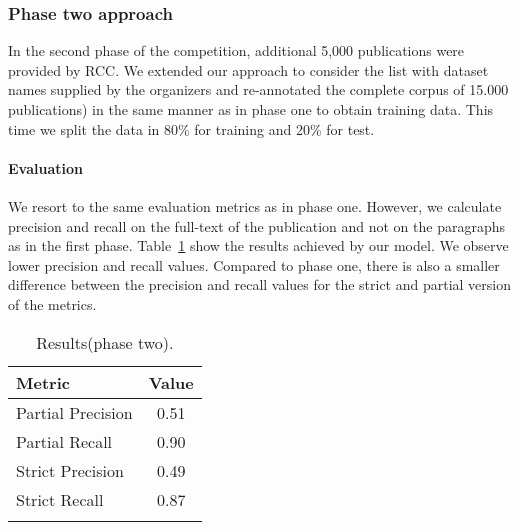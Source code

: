 \subsubsection{Phase two approach}
In the second phase of the competition, additional 5,000 publications were provided by RCC. We extended our approach to consider the list with dataset names supplied by the organizers and re-annotated the complete corpus of 15.000 publications) in the same manner as in phase one to obtain training data. This time we split the data in 80\% for training and 20\% for test. 

\paragraph{Evaluation}
We resort to the same evaluation metrics as in phase one. However, we calculate precision and recall on the full-text of the publication and not on the paragraphs as in the first phase. Table~\ref{table:dataset-mention-eval-phase-two} show the results achieved by our model. We observe lower precision and recall values. Compared to phase one, there is also a smaller difference between the precision and recall values for the strict and partial version of the metrics. 
\begin{table}[hb]
    \center 
    \caption{Results(phase two).} 
    \begin{tabular}{lc} 
        \toprule
        Metric  & Value \\
        \midrule
        Partial Precision   & 0.51 \\
        Partial Recall      & 0.90 \\
        \midrule
        Strict Precision    & 0.49 \\
        Strict Recall       & 0.87 \\ 
        \bottomrule \\ 
    \end{tabular} 
    \label{table:dataset-mention-eval-phase-two} 
\end{table}

